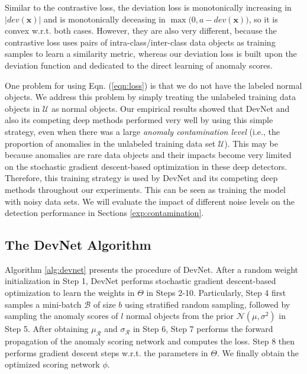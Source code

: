 \documentclass[sigconf]{acmart}
\begin{document}
Similar to the contrastive loss, the deviation loss is monotonically increasing in $|\mathit{dev}(\mathbf{x})|$ and is monotonically deceasing in $\max\big(0, a - \mathit{dev}(\mathbf{x})\big)$, so it is convex w.r.t. both cases. However, they are also very different, because the contrastive loss uses pairs of intra-class/inter-class data objects as training samples to learn a similarity metric, whereas our deviation loss is built upon the deviation function and dedicated to the direct learning of anomaly scores.

One problem for using Eqn. (\ref{eqn:loss}) is that we do not have the labeled normal objects. We address this problem by simply treating the unlabeled training data objects in $\mathcal{U}$ as normal objects. Our empirical results showed that DevNet and also its competing deep methods performed very well by using this simple strategy, even when there was a large \textit{anomaly contamination level} (i.e., the proportion of anomalies in the unlabeled training data set $\mathcal{U}$). This may be because anomalies are rare data objects and their impacts become very limited on the stochastic gradient descent-based optimization in these deep detectors. Therefore, this training strategy is used by DevNet and its competing deep methods throughout our experiments. This can be seen as training the model with noisy data sets. We will evaluate the impact of different noise levels on the detection performance in Sections \ref{exp:contamination}.

\subsection{The DevNet Algorithm}\label{sec:algo}

Algorithm \ref{alg:devnet} presents the procedure of DevNet. After a random weight initialization in Step 1, DevNet performs stochastic gradient descent-based optimization to learn the weights in $\Theta$ in Steps 2-10. Particularly, Step 4 first samples a mini-batch $\mathcal{B}$ of size $b$ using stratified random sampling, followed by sampling the anomaly scores of $l$ normal objects from the prior $\mathcal{N}(\mu, \sigma^2)$ in Step 5. After obtaining $\mu_{\mathcal{R}}$ and $\sigma_{\mathcal{R}}$ in Step 6, Step 7 performs the forward propagation of the anomaly scoring network and computes the loss. Step 8 then performs gradient descent steps w.r.t. the parameters in $\Theta$. We finally obtain the optimized scoring network $\phi$.
\end{document}
